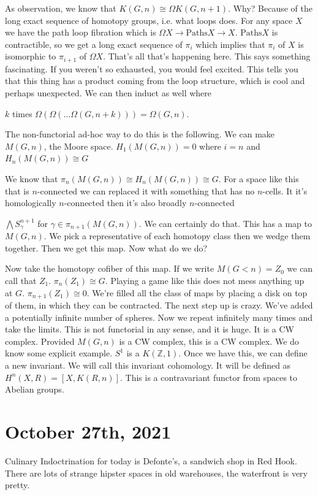 \documentclass[12pt]{article}
\theoremstyle{definition}
\begin{document}
As observation, we know that $K(G,n)\cong \Omega K(G,n+1)$. Why? Because of the long exact sequence of homotopy groups, i.e. what loops does. For any space $X$ we have the path loop fibration which is $\Omega X\to \text{Paths} X\to X$. $\text{Paths} X$ is contractible, so we get a long exact sequence of $\pi_i$ which implies that $\pi_i$ of $X$ is isomorphic to $\pi_{i+1}$ of $\Omega X$. That's all that's happening here. This says something fascinating. If you weren't so exhausted, you would feel excited. This tells you that this thing has a product coming from the loop structure, which is cool and perhaps unexpected. 
We can then induct as well where

$k$ times $\Omega(\Omega(\dots \Omega(G,n+k)))=\Omega(G,n)$. 

The non-functorial ad-hoc way to do this is the following. We can make $M(G,n)$, the Moore space. $H_1(M(G,n))=0$ where $i=n$ and $H_n(M(G,n))\cong G$

We know that $\pi_n(M(G,n))\cong H_n(M(G,n))\cong G$. For a space like this that is $n$-connected we can replaced it with something that has no $n$-cells. It it's homologically $n$-connected then it's also broadly $n$-connected

$\bigwedge S_\gamma^{n+1}$ for $\gamma\in \pi_{n+1}(M(G,n))$. We can certainly do that. This has a map to $M(G,n)$. We pick a representative of each homotopy class then we wedge them together. Then we get this map. Now what do we do? 

Now take the homotopy cofiber of this map. If we write $M(G<n)=Z_0$ we can call that $Z_1$. $\pi_n(Z_1)\cong G$. Playing a game like this does not mess anything up at $G$. $\pi_{n+1}(Z_1)\cong 0$. We're filled all the class of maps by placing a disk on top of them, in which they can be contracted. The next step up is crazy. We've added a potentially infinite number of spheres. Now we repeat infinitely many times and take the limits. This is not functorial in any sense, and it is huge. It is a CW complex. Provided $M(G,n)$ is a CW complex, this is a CW complex. We do know some explicit example. $S^1$ is a $K(\mathbb{Z},1)$. Once we have this, we can define a new invariant. We will call this invariant cohomology. It will be defined as $H^n(X,R)=[X,K(R,n)]$. This is a contravariant functor from spaces to Abelian groups. 
\section{October 27th, 2021}
	Culinary Indoctrination for today is Defonte's, a sandwich shop in Red Hook. There are lots of strange hipster spaces in old warehouses, the waterfront is very pretty. 
	
\end{document}
